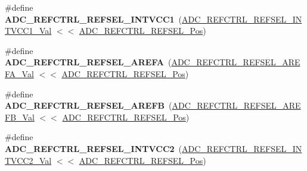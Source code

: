 \begin{DoxyCompactItemize}
\item 
\hypertarget{group___s_a_m_l21___a_d_c_ga8b1a7f0ce9aa084387fcd99597099db0}{}\#define {\bfseries A\+D\+C\+\_\+\+R\+E\+F\+C\+T\+R\+L\+\_\+\+R\+E\+F\+S\+E\+L\+\_\+\+I\+N\+T\+V\+C\+C1}~(\hyperlink{group___s_a_m_l21___a_d_c_ga82f083020e2747f258e7be98ce53d76c}{A\+D\+C\+\_\+\+R\+E\+F\+C\+T\+R\+L\+\_\+\+R\+E\+F\+S\+E\+L\+\_\+\+I\+N\+T\+V\+C\+C1\+\_\+\+Val} $<$$<$ \hyperlink{group___s_a_m_l21___a_d_c_ga7b8a65054da09cd11886d730594eb8d3}{A\+D\+C\+\_\+\+R\+E\+F\+C\+T\+R\+L\+\_\+\+R\+E\+F\+S\+E\+L\+\_\+\+Pos})\label{group___s_a_m_l21___a_d_c_ga8b1a7f0ce9aa084387fcd99597099db0}

\item 
\hypertarget{group___s_a_m_l21___a_d_c_ga9ff4f1f4183424a306f8b1397c4fe24a}{}\#define {\bfseries A\+D\+C\+\_\+\+R\+E\+F\+C\+T\+R\+L\+\_\+\+R\+E\+F\+S\+E\+L\+\_\+\+A\+R\+E\+F\+A}~(\hyperlink{group___s_a_m_l21___a_d_c_ga1b593007ede54d3fc5aa91c51eb7d052}{A\+D\+C\+\_\+\+R\+E\+F\+C\+T\+R\+L\+\_\+\+R\+E\+F\+S\+E\+L\+\_\+\+A\+R\+E\+F\+A\+\_\+\+Val}  $<$$<$ \hyperlink{group___s_a_m_l21___a_d_c_ga7b8a65054da09cd11886d730594eb8d3}{A\+D\+C\+\_\+\+R\+E\+F\+C\+T\+R\+L\+\_\+\+R\+E\+F\+S\+E\+L\+\_\+\+Pos})\label{group___s_a_m_l21___a_d_c_ga9ff4f1f4183424a306f8b1397c4fe24a}

\item 
\hypertarget{group___s_a_m_l21___a_d_c_gad05ff3d62baacca1ed9bdad9fbdeb416}{}\#define {\bfseries A\+D\+C\+\_\+\+R\+E\+F\+C\+T\+R\+L\+\_\+\+R\+E\+F\+S\+E\+L\+\_\+\+A\+R\+E\+F\+B}~(\hyperlink{group___s_a_m_l21___a_d_c_ga6d43250a0758129bc25bc5c183ae25c3}{A\+D\+C\+\_\+\+R\+E\+F\+C\+T\+R\+L\+\_\+\+R\+E\+F\+S\+E\+L\+\_\+\+A\+R\+E\+F\+B\+\_\+\+Val}  $<$$<$ \hyperlink{group___s_a_m_l21___a_d_c_ga7b8a65054da09cd11886d730594eb8d3}{A\+D\+C\+\_\+\+R\+E\+F\+C\+T\+R\+L\+\_\+\+R\+E\+F\+S\+E\+L\+\_\+\+Pos})\label{group___s_a_m_l21___a_d_c_gad05ff3d62baacca1ed9bdad9fbdeb416}

\item 
\hypertarget{group___s_a_m_l21___a_d_c_gafa961e9d62794f989191ccc57167fe3a}{}\#define {\bfseries A\+D\+C\+\_\+\+R\+E\+F\+C\+T\+R\+L\+\_\+\+R\+E\+F\+S\+E\+L\+\_\+\+I\+N\+T\+V\+C\+C2}~(\hyperlink{group___s_a_m_l21___a_d_c_ga8322e439473c9a04c96228a696f58e35}{A\+D\+C\+\_\+\+R\+E\+F\+C\+T\+R\+L\+\_\+\+R\+E\+F\+S\+E\+L\+\_\+\+I\+N\+T\+V\+C\+C2\+\_\+\+Val} $<$$<$ \hyperlink{group___s_a_m_l21___a_d_c_ga7b8a65054da09cd11886d730594eb8d3}{A\+D\+C\+\_\+\+R\+E\+F\+C\+T\+R\+L\+\_\+\+R\+E\+F\+S\+E\+L\+\_\+\+Pos})\label{group___s_a_m_l21___a_d_c_gafa961e9d62794f989191ccc57167fe3a}


\end{DoxyCompactItemize}
